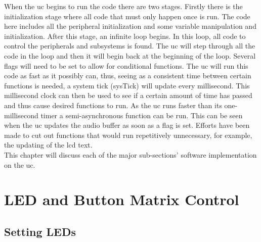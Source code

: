 \documentclass[12pt,a4paper]{report}
\begin{document}
\noindent When the \ac{uc} begins to run the code there are two stages. Firstly there is the initialization stage where all code that must only happen once is run. The code here includes all the peripheral initialization and some variable manipulation and initialization. After this stage, an infinite loop begins. In this loop, all code to control the peripherals and subsystems is found. The \ac{uc} will step through all the code in the loop and then it will begin back at the beginning of the loop. Several flags will need to be set to allow for conditional functions. The \ac{uc} will run this code as fast as it possibly can, thus, seeing as a consistent time between certain functions is needed, a system tick (sysTick) will update every millisecond. This millisecond clock can then be used to see if a certain amount of time has passed and thus cause desired functions to run. As the \ac{uc} runs faster than its one-millisecond timer a semi-asynchronous function can be run. This can be seen when the \ac{uc} updates the audio buffer as soon as a flag is set. Efforts have been made to cut out functions that would run repetitively unnecessary, for example, the updating of the \ac{lcd} text.\\
This chapter will discuss each of the major sub-sections' software implementation on the \ac{uc}. 
\section{LED and Button Matrix Control}
\subsection{Setting LEDs}
\end{document}
